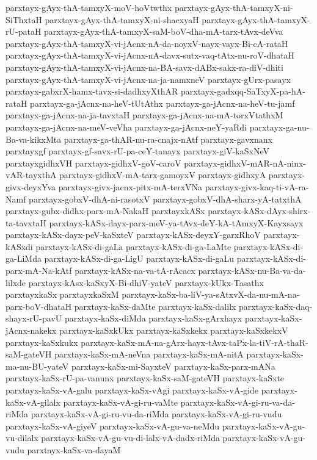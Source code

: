 {parxtayx-gAyx-thA-tamxyX-moV-hoVtwthx
parxtayx-gAyx-thA-tamxyX-ni-SiThxtaH
parxtayx-gAyx-thA-tamxyX-ni-shacxyaH
parxtayx-gAyx-thA-tamxyX-rU-pataH
parxtayx-gAyx-thA-tamxyX-saM-boV-dha-mA-tarx-tAvx-deVva
parxtayx-gAyx-thA-tamxyX-vi-jAcnx-nA-da-noyxV-nayx-vayx-Bi-cA-rataH
parxtayx-gAyx-thA-tamxyX-vi-jAcnx-nA-davx-sutx-vaq-tAtx-nu-roV-dhataH
parxtayx-gAyx-thA-tamxyX-vi-jAcnx-na-BA-savx-dABx-sakx-ra-diV-dhiti
parxtayx-gAyx-thA-tamxyX-vi-jAcnx-na-ja-namxneV
parxtayx-gUrx-pasayx
parxtayx-gabxrX-hamx-tavx-si-dadhxyXthAR
parxtayx-gadxqq-SaTxyX-pa-hA-rataH
parxtayx-ga-jAcnx-na-heV-tUtAthx
parxtayx-ga-jAcnx-na-heV-tu-jamf
parxtayx-ga-jAcnx-na-ja-tavxtaH
parxtayx-ga-jAcnx-na-mA-torxVtathxM
parxtayx-ga-jAcnx-na-meV-veVha
parxtayx-ga-jAcnx-neY-yaRdi
parxtayx-ga-nu-Ba-va-kikxMta
parxtayx-ga-thAR-nu-ra-cnajx-nAtf
parxtayx-gavxnanx
parxtayxgf
parxtayx-gf-savx-rU-pa-ceY-tanayx
parxtayx-giV-kaSxNeV
parxtayxgidhxVH
parxtayx-gidhxV-goV-caroV
parxtayx-gidhxV-mAR-nA-ninx-vAR-tayxthA
parxtayx-gidhxV-mA-tarx-gamoyxV
parxtayx-gidhxyA
parxtayx-givx-deyxYva
parxtayx-givx-jacnx-pitx-mA-terxVNa
parxtayx-givx-kaq-ti-vA-ra-Namf
parxtayx-gobxV-dhA-ni-rasotxV
parxtayx-gobxV-dhA-sharx-yA-tatxthA
parxtayx-gubx-didhx-parx-mA-NakaH
parxtayxkASx
parxtayx-kASx-dAyx-shirx-ta-tavxtaH
parxtayx-kASx-dayx-parx-meV-ya-tAvx-deY-kA-tAmxyX-Kayxsayx
parxtayx-kASx-dayx-peV-kaSxteV
parxtayx-kASx-deyxY-garxRhoV
parxtayx-kASxdi
parxtayx-kASx-di-gaLa
parxtayx-kASx-di-ga-LaMte
parxtayx-kASx-di-ga-LiMda
parxtayx-kASx-di-ga-LigU
parxtayx-kASx-di-gaLu
parxtayx-kASx-di-parx-mA-Na-kAtf
parxtayx-kASx-na-va-tA-rAcacx
parxtayx-kASx-nu-Ba-va-da-lilxde
parxtayx-kAsx-kaSxyX-Bi-dhiV-yateV
parxtayx-kUkx-Tasathx
parxtayxkaSx
parxtayxkaSxM
parxtayx-kaSx-ba-liV-ya-sAtxvX-da-nu-mA-na-parx-boV-dhataH
parxtayx-kaSx-daMte
parxtayx-kaSx-dalilx
parxtayx-kaSx-daq-shayx-rU-pavU
parxtayx-kaSx-diMda
parxtayx-kaSx-gArxhayx
parxtayx-kaSx-jAcnx-nakekx
parxtayx-kaSxkUkx
parxtayx-kaSxkekx
parxtayx-kaSxkekxV
parxtayx-kaSxkukx
parxtayx-kaSx-mA-na-gArx-hayx-tAvx-taPx-la-tiV-rA-thaR-saM-gateVH
parxtayx-kaSx-mA-neVna
parxtayx-kaSx-mA-nitA
parxtayx-kaSx-ma-nu-BU-yateV
parxtayx-kaSx-mi-SayxteV
parxtayx-kaSx-parx-mANa
parxtayx-kaSx-rU-pa-vanunx
parxtayx-kaSx-saM-gateVH
parxtayx-kaSxte
parxtayx-kaSx-vA-galu
parxtayx-kaSx-vAgi
parxtayx-kaSx-vA-gide
parxtayx-kaSx-vA-gilalx
parxtayx-kaSx-vA-gi-ru-vaMte
parxtayx-kaSx-vA-gi-ru-va-da-riMda
parxtayx-kaSx-vA-gi-ru-vu-da-riMda
parxtayx-kaSx-vA-gi-ru-vudu
parxtayx-kaSx-vA-giyeV
parxtayx-kaSx-vA-gu-va-neMdu
parxtayx-kaSx-vA-gu-vu-dilalx
parxtayx-kaSx-vA-gu-vu-di-lalx-vA-dadx-riMda
parxtayx-kaSx-vA-gu-vudu
parxtayx-kaSx-va-dayaM
}
